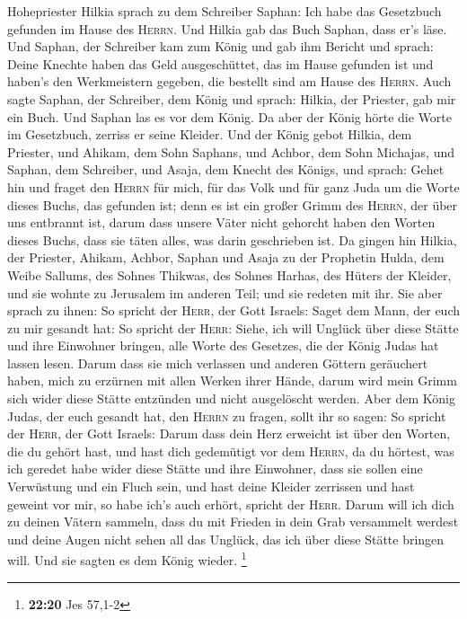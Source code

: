 Hohepriester Hilkia sprach zu dem Schreiber Saphan: Ich habe das
Gesetzbuch gefunden im Hause des \textsc{Herrn}. Und Hilkia gab das Buch
Saphan, dass er's läse.  Und Saphan, der Schreiber kam zum
König und gab ihm Bericht und sprach: Deine Knechte haben das Geld
ausgeschüttet, das im Hause gefunden ist und haben's den Werkmeistern
gegeben, die bestellt sind am Hause des \textsc{Herrn}. 
Auch sagte Saphan, der Schreiber, dem König und sprach: Hilkia, der
Priester, gab mir ein Buch. Und Saphan las es vor dem König.
 Da aber der König hörte die Worte im Gesetzbuch, zerriss
er seine Kleider.  Und der König gebot Hilkia, dem
Priester, und Ahikam, dem Sohn Saphans, und Achbor, dem Sohn Michajas,
und Saphan, dem Schreiber, und Asaja, dem Knecht des Königs, und sprach:
 Gehet hin und fraget den \textsc{Herrn} für mich, für
das Volk und für ganz Juda um die Worte dieses Buchs, das gefunden ist;
denn es ist ein großer Grimm des \textsc{Herrn}, der über uns entbrannt
ist, darum dass unsere Väter nicht gehorcht haben den Worten dieses
Buchs, dass sie täten alles, was darin geschrieben ist. 
Da gingen hin Hilkia, der Priester, Ahikam, Achbor, Saphan und Asaja zu
der Prophetin Hulda, dem Weibe Sallums, des Sohnes Thikwas, des Sohnes
Harhas, des Hüters der Kleider, und sie wohnte zu Jerusalem im anderen
Teil; und sie redeten mit ihr.  Sie aber sprach zu ihnen:
So spricht der \textsc{Herr}, der Gott Israels: Saget dem Mann, der euch
zu mir gesandt hat:  So spricht der \textsc{Herr}: Siehe,
ich will Unglück über diese Stätte und ihre Einwohner bringen, alle
Worte des Gesetzes, die der König Judas hat lassen lesen.
 Darum dass sie mich verlassen und anderen Göttern
geräuchert haben, mich zu erzürnen mit allen Werken ihrer Hände, darum
wird mein Grimm sich wider diese Stätte entzünden und nicht ausgelöscht
werden.  Aber dem König Judas, der euch gesandt hat, den
\textsc{Herrn} zu fragen, sollt ihr so sagen: So spricht der
\textsc{Herr}, der Gott Israels:  Darum dass dein Herz
erweicht ist über den Worten, die du gehört hast, und hast dich
gedemütigt vor dem \textsc{Herrn}, da du hörtest, was ich geredet habe
wider diese Stätte und ihre Einwohner, dass sie sollen eine Verwüstung
und ein Fluch sein, und hast deine Kleider zerrissen und hast geweint
vor mir, so habe ich's auch erhört, spricht der \textsc{Herr}.
 Darum will ich dich zu deinen Vätern sammeln, dass du
mit Frieden in dein Grab versammelt werdest und deine Augen nicht sehen
all das Unglück, das ich über diese Stätte bringen will. Und sie sagten
es dem König wieder. \footnote{\textbf{22:20} Jes 57,1-2}

